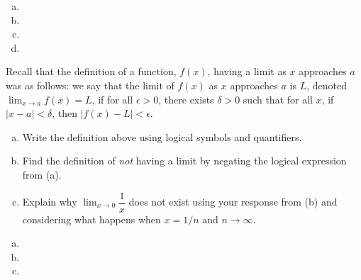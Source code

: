 \documentclass[11pt,letterpaper]{article}
\begin{document}
\sol
\begin{enumerate}[(a)]
\item 
\item 
\item 
\item 
\end{enumerate}



\newpage



 Recall that the definition of a function, $f(x)$, having a limit as $x$ approaches $a$ was as follows: we say that the limit of $f(x)$ as $x$ approaches $a$ is $L$, denoted $\displaystyle \lim_{x \to a} f(x)= L$, if for all $\epsilon > 0$, there exists $\delta > 0$ such that for all $x$, if $|x - a| < \delta$, then $|f(x) - L| < \epsilon$. 
	\begin{enumerate}[(a)]
	\item Write the definition above using logical symbols and quantifiers.
	\item Find the definition of \textit{not} having a limit by negating the logical expression from (a).
	\item Explain why $\displaystyle \lim_{x \to 0} \dfrac{1}{x}$ does not exist using your response from (b) and considering what happens when $x= 1/n$ and $n \to \infty$. 
	\end{enumerate} \pspace

\sol
\begin{enumerate}[(a)]
\item 
\item 
\item 
\end{enumerate}
\end{document}
